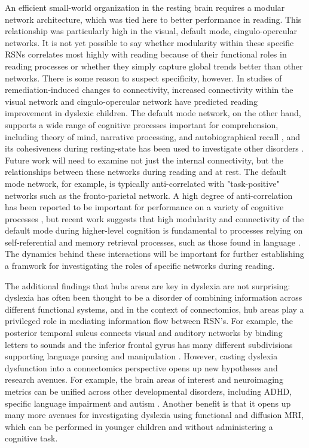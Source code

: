 An efficient small-world organization in the resting brain requires a modular network architecture, which was tied here to better performance in reading. This relationship was particularly high in the visual, default mode, cingulo-opercular networks. It is not yet possible to say whether modularity within these specific RSNs correlates most highly with reading because of their functional roles in reading processes or whether they simply capture global trends better than other networks. There is some reason to suspect specificity, however. In studies of remediation-induced changes to connectivity, increased connectivity within the visual network \citep{Koyama2013} and cingulo-opercular network \citep{HorowitzKraus2015} have predicted reading improvement in dyslexic children. The default mode network, on the other hand, supports a wide range of cognitive processes important for comprehension, including theory of mind, narrative processing, and autobiographical recall \citep{Buckner2008, AbdulSabur2014}, and its cohesiveness during resting-state has been used to investigate other disorders \citep{Uddin2008}. Future work will need to examine not just the internal connectivity, but the relationships between these networks during reading and at rest. The default mode network, for example, is typically anti-correlated with "task-positive" networks such as the fronto-parietal network. A high degree of anti-correlation has been reported to be important for performance on a variety of cognitive processes \citep{Fox2005, Keller2015}, but recent work suggests that high modularity and connectivity of the default mode during higher-level cognition is fundamental to processes relying on self-referential and memory retrieval processes, such as those found in language \citep{Vatansever2015}. The dynamics behind these interactions will be important for further establishing a framwork for investigating the roles of specific networks during reading. 

The additional findings that hubs areas are key in dyslexia are not surprising: dyslexia has often been thought to be a disorder of combining information across different functional systems, and in the context of connectomics, hub areas play a privileged role in mediating information flow between RSN’s. For example, the posterior temporal sulcus connects visual and auditory networks by binding letters to sounds \citep{Blau2010, VanAtteveldt2009} and the inferior frontal gyrus has many different subdivisions supporting language parsing and manipulation \citep{Hagoort2005}. However, casting dyslexia dysfunction into a connectomics perspective opens up new hypotheses and research avenues. For example, the brain areas of interest and neuroimaging metrics can be unified across other developmental disorders, including ADHD, specific language impairment and autism \citep{Stam2014}. Another benefit is that it opens up many more avenues for investigating dyslexia using functional and diffusion MRI, which can be performed in younger children and without administering a cognitive task. 








